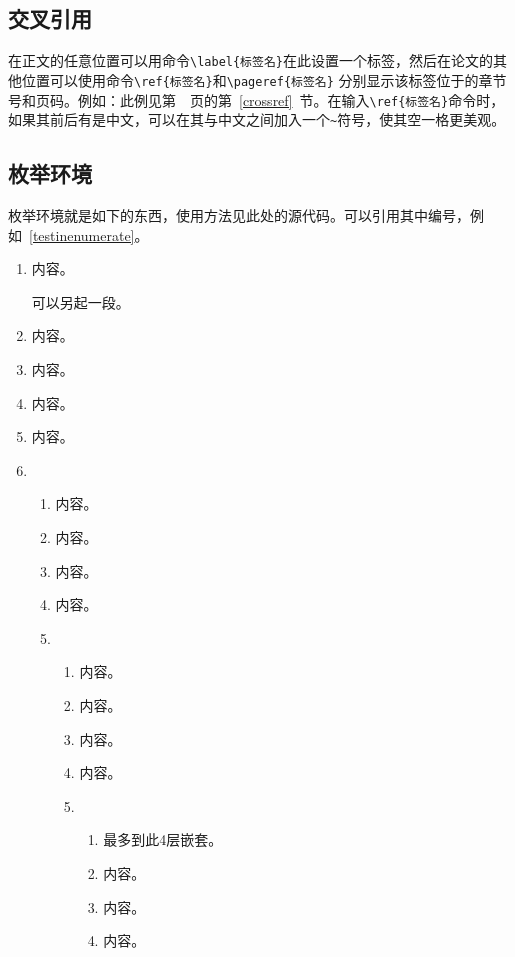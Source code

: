 \subsection{交叉引用}
在正文的任意位置可以用命令\verb|\label{标签名}|\label{crossref}在此设置一个标签，然后在论文的其他位置可以使用命令\verb|\ref{标签名}|和\verb|\pageref{标签名}| 分别显示该标签位于的章节号和页码。例如：此例见第~\pageref{crossref}~页的第~\ref{crossref}~节。在输入\verb|\ref{标签名}|命令时，如果其前后有是中文，可以在其与中文之间加入一个\verb|~|符号，使其空一格更美观。

\subsection{枚举环境}
枚举环境就是如下的东西，使用方法见此处的源代码。可以引用其中编号，例如~\ref{testinenumerate}。
\begin{enumerate}
\item 内容。

可以另起一段。
\item 内容。
\item 内容。
\item 内容。
\item 内容。
\item
    \begin{enumerate}
    \item 内容。
    \item 内容。
    \item 内容。
    \item 内容。
    \item
        \begin{enumerate}
        \item 内容。
        \item 内容。
        \item 内容。
        \item 内容。
        \item
            \begin{enumerate}
            \item 最多到此4层嵌套。
            \item 内容。
            \item 内容。
            \item 内容\label{testinenumerate}。
            \end{enumerate}
        \end{enumerate}
    \end{enumerate}
\end{enumerate}
